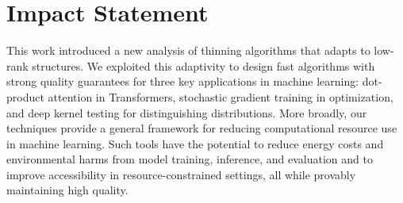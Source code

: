 \section*{Impact Statement}

This work introduced a new analysis of thinning algorithms that adapts to low-rank structures.
We exploited this adaptivity to design fast algorithms with strong quality guarantees for  three key applications in machine learning: dot-product attention in Transformers, stochastic gradient training in optimization, and deep kernel testing for distinguishing distributions.
More broadly, our techniques provide a general framework for reducing computational resource use in machine learning. Such tools have the potential to reduce energy costs and environmental harms from model training, inference, and evaluation and to improve accessibility in resource-constrained settings, all while provably maintaining high quality. %
%
%
%
%
%

%
%
%
%
%
%
%
%
%
%
%

%
%
%

%
%
%
%
